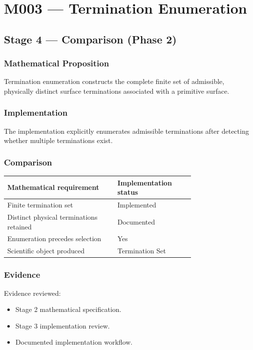 \chapter{M003 --- Termination Enumeration}

\section{Stage 4 --- Comparison (Phase 2)}

\subsection{Mathematical Proposition}

Termination enumeration constructs the complete finite set of admissible,
physically distinct surface terminations associated with a primitive
surface.

\subsection{Implementation}

The implementation explicitly enumerates admissible terminations after
detecting whether multiple terminations exist.

\subsection{Comparison}

\begin{center}
\begin{tabular}{|p{0.46\linewidth}|p{0.30\linewidth}|}
\hline
Mathematical requirement & Implementation status\\
\hline
Finite termination set & Implemented\\
Distinct physical terminations retained & Documented\\
Enumeration precedes selection & Yes\\
Scientific object produced & Termination Set\\
\hline
\end{tabular}
\end{center}

\subsection{Evidence}

Evidence reviewed:

\begin{itemize}
\item Stage 2 mathematical specification.
\item Stage 3 implementation review.
\item Documented implementation workflow.
\end{itemize}

